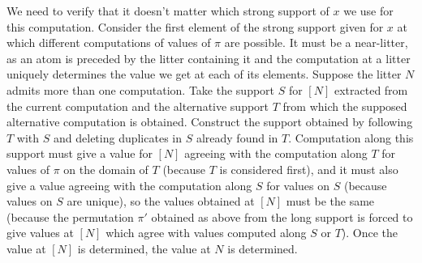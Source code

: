 \documentclass{slides}
\begin{document}
\begin{slide}

We need to verify that it doesn't matter which strong support of $x$ we use for this computation.  Consider the first element of the strong support given for
$x$ at which different computations of values of $\pi$ are possible.  It must be a near-litter, as an atom is preceded by the litter containing it and the computation at a litter
uniquely determines the value we get at each of its elements.  Suppose the litter $N$ admits more than one computation.  Take the support $S$ for $[N]$ extracted
from the current computation and the alternative support $T$ from which the supposed alternative computation is obtained.  Construct the support obtained by
following $T$ with $S$ and deleting duplicates in $S$ already found in $T$.  Computation along this support must give a value for $[N]$ agreeing with the computation
along $T$ for values of $\pi$ on the domain of $T$ (because $T$ is considered first), and it must also give a value agreeing with the computation along $S$ for values on $S$ (because values on $S$ are unique), so the values obtained at $[N]$ must be the same (because the permutation $\pi'$ obtained as above from the long support is forced to give values at $[N]$ which agree with values computed along $S$ or $T$).  Once the value at $[N]$ is determined, the value at $N$ is determined.

\end{slide}
\end{document}
